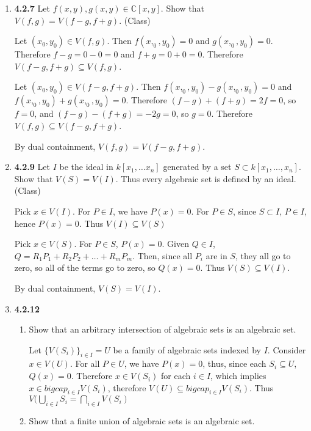 \documentclass[12pt]{article}
\newcommand{\C}{\mathbb{C}}
\begin{document}
\begin{enumerate}
    \item \textbf{4.2.7} Let $f(x,y), g(x,y)\in \C[x,y]$.  Show that $V(f,g) = V(f-g, f+g)$. (Class)
    
    Let $(x_0, y_0)\in V(f,g)$.  Then $f(x,_0,y_0)=0$ and $g(x,_0,y_0)=0$.  Therefore $f-g=0-0=0$ and $f+g=0+0=0$.  Therefore $V(f-g, f+g)\subseteq V(f,g)$.
    
    Let $(x_0, y_0)\in V(f-g, f+g)$.  Then $f(x,_0,y_0)-g(x,_0,y_0)=0$ and $f(x,_0,y_0)+g(x,_0,y_0)=0$.  Therefore $(f-g)+(f+g) = 2f=0$, so $f=0$, and $(f-g)-(f+g)=-2g = 0$, so $g=0$.  Therefore $ V(f,g) \subseteq V(f-g, f+g)$.
    
    By dual containment, $V(f,g) = V(f-g, f+g)$.
    
    \item \textbf{4.2.9} Let $I$ be the ideal in $k[x_1, \dots x_n]$ generated by a set $S\subset k[x_1, \dots, x_n]$.  Show that $V(S)=V(I)$.  Thus every algebraic set is defined by an ideal. (Class)
    
    Pick $x\in V(I)$.  For $P\in I$, we have $P(x)=0$.   For $P\in S$, since $S\subset I$, $P\in I$, hence $P(x)=0$.  Thus $V(I)\subseteq V(S)$
    
    Pick $x\in V(S)$.   For $P\in S$, $P(x)=0$.  Given $Q\in I$, $Q=R_1P_1+R_2P_2+\dots +R_mP_m$.  Then, since all $P_i$ are in $S$, they all go to zero, so all of the terms go to zero, so $Q(x)=0$.  Thus $V(S)\subseteq V(I)$.
    
    By dual containment, $V(S)=V(I)$.

 \item \textbf{4.2.12} \begin{enumerate}
 \item Show that an arbitrary intersection of algebraic sets is an algebraic set.
 
 Let $\{V(S_i)\}_{i\in I} = U$ be a family of algebraic sets indexed by $I$.  
 Consider $x\in V(U)$.  For all $P\in U$, we have $P(x)=0$, thus, since each $S_i \subseteq U$, $Q(x)=0$.  Therefore $x\in V(S_i)$ for each $i\in I$, which implies $x\in bigcap_{i\in I} V(S_i)$, therefore $V(U) \subseteq bigcap_{i\in I} V(S_i)$.  Thus $V(\bigcup_{i\in I} S_i = \bigcap_{i\in I} V(S_i)$
 
 \item Show that a finite union of algebraic sets is an algebraic set.
 

\end{enumerate}
\end{enumerate}
\end{document}
